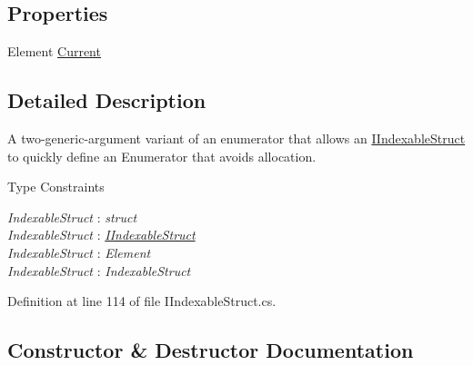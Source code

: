 \subsection*{Properties}
\begin{DoxyCompactItemize}
\item 
Element \mbox{\hyperlink{struct_leap_1_1_unity_1_1_indexable_struct_enumerator_ae954bec4320b564946caacf94417605e}{Current}}
\end{DoxyCompactItemize}


\subsection{Detailed Description}
A two-\/generic-\/argument variant of an enumerator that allows an \mbox{\hyperlink{interface_leap_1_1_unity_1_1_i_indexable_struct}{I\+Indexable\+Struct}} to quickly define an Enumerator that avoids allocation. 

\begin{Desc}
\item[Type Constraints]\begin{description}
\item[{\em Indexable\+Struct} : {\em struct}]\item[{\em Indexable\+Struct} : {\em \mbox{\hyperlink{interface_leap_1_1_unity_1_1_i_indexable_struct}{I\+Indexable\+Struct}}}]\item[{\em Indexable\+Struct} : {\em Element}]\item[{\em Indexable\+Struct} : {\em Indexable\+Struct}]\end{description}
\end{Desc}


Definition at line 114 of file I\+Indexable\+Struct.\+cs.



\subsection{Constructor \& Destructor Documentation}
\mbox{\label{struct_leap_1_1_unity_1_1_indexable_struct_enumerator_a21ea023ae2c258a3385ca4c6edf2aafe}} 
